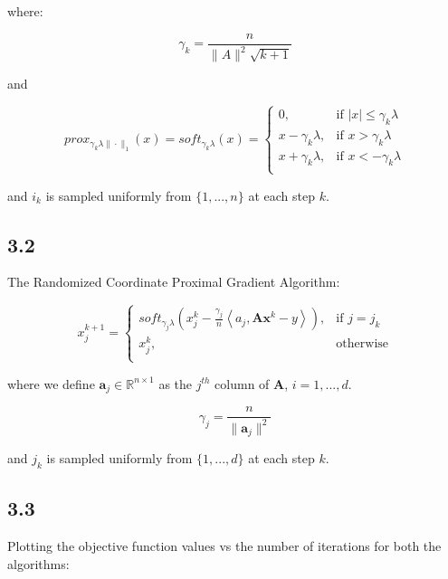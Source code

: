 \documentclass[12pt]{article}
\begin{document}
where:

\[\gamma_k = \frac{n}{\|A\|^2 \sqrt{k+1}}\]

and

\[prox_{\gamma_k \lambda \|\cdot\|_1}(x) = soft_{\gamma_k \lambda}(x) = \begin{cases}
      0, &  \text{if } |x| \leq \gamma_k \lambda \\
      x-\gamma_k \lambda, & \text{if } x > \gamma_k \lambda \\
      x+\gamma_k \lambda, & \text{if } x < - \gamma_k \lambda \\
   \end{cases}\]

and $i_k$ is sampled uniformly from $\{1, ..., n\}$ at each step $k$.

\subsection*{3.2}

The Randomized Coordinate Proximal Gradient Algorithm:

\[x_j^{k+1} = \begin{cases}
      soft_{\gamma_j \lambda}(x_j^k - \frac{\gamma_j}{n} \left\langle a_j, \textbf{A} \textbf{x}^k - y\right\rangle), & \text{if } j = j_k \\
      x_j^k, & \text{otherwise} \\
   \end{cases}
\]

where we define $\textbf{a}_j \in \mathbb{R}^{n \times 1}$ as the $j^{th}$ column of $\textbf{A}$, $i=1, ..., d$.

\[\gamma_j = \frac{n}{\|\textbf{a}_j\|^2}\]

and $j_k$ is sampled uniformly from $\{1, ..., d\}$ at each step $k$.

\newpage
\subsection*{3.3}

Plotting the objective function values vs the number of iterations for both the algorithms:
\end{document}

